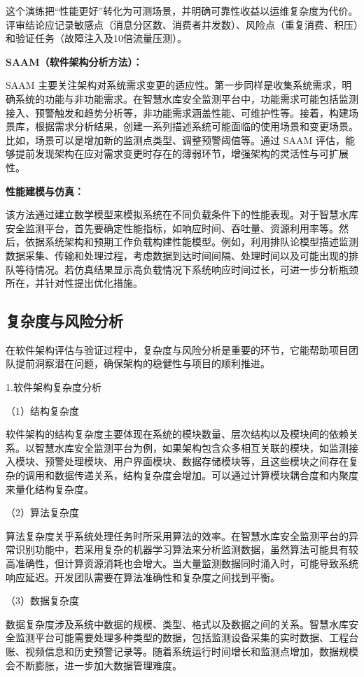 这个演练把“性能更好”转化为可测场景，并明确可靠性收益以运维复杂度为代价。评审结论应记录敏感点（消息分区数、消费者并发数）、风险点（重复消费、积压）和验证任务（故障注入及10倍流量压测）。

\textbf{SAAM（软件架构分析方法）：}

SAAM 主要关注架构对系统需求变更的适应性。第一步同样是收集系统需求，明确系统的功能与非功能需求。在智慧水库安全监测平台中，功能需求可能包括监测接入、预警触发和趋势分析等，非功能需求涵盖性能、可维护性等。接着，构建场景库，根据需求分析结果，创建一系列描述系统可能面临的使用场景和变更场景。比如，场景可以是增加新的监测点类型、调整预警阈值等。通过 SAAM 评估，能够提前发现架构在应对需求变更时存在的薄弱环节，增强架构的灵活性与可扩展性。

\textbf{性能建模与仿真：}

该方法通过建立数学模型来模拟系统在不同负载条件下的性能表现。对于智慧水库安全监测平台，首先要确定性能指标，如响应时间、吞吐量、资源利用率等。然后，依据系统架构和预期工作负载构建性能模型。例如，利用排队论模型描述监测数据采集、传输和处理过程，考虑数据到达时间间隔、处理时间以及可能出现的排队等待情况。若仿真结果显示高负载情况下系统响应时间过长，可进一步分析瓶颈所在，并针对性提出优化措施。

\subsection{复杂度与风险分析}

在软件架构评估与验证过程中，复杂度与风险分析是重要的环节，它能帮助项目团队提前洞察潜在问题，确保架构的稳健性与项目的顺利推进。

1.软件架构复杂度分析

（1）结构复杂度

软件架构的结构复杂度主要体现在系统的模块数量、层次结构以及模块间的依赖关系。以智慧水库安全监测平台为例，如果架构包含众多相互关联的模块，如监测接入模块、预警处理模块、用户界面模块、数据存储模块等，且这些模块之间存在复杂的调用和数据传递关系，结构复杂度会增加。可以通过计算模块耦合度和内聚度来量化结构复杂度。

（2）算法复杂度

算法复杂度关乎系统处理任务时所采用算法的效率。在智慧水库安全监测平台的异常识别功能中，若采用复杂的机器学习算法来分析监测数据，虽然算法可能具有较高准确性，但计算资源消耗也会增大。当大量监测数据同时涌入时，可能导致系统响应延迟。开发团队需要在算法准确性和复杂度之间找到平衡。

（3）数据复杂度

数据复杂度涉及系统中数据的规模、类型、格式以及数据之间的关系。智慧水库安全监测平台可能需要处理多种类型的数据，包括监测设备采集的实时数据、工程台账、视频信息和历史预警记录等。随着系统运行时间增长和监测点增加，数据规模会不断膨胀，进一步加大数据管理难度。

